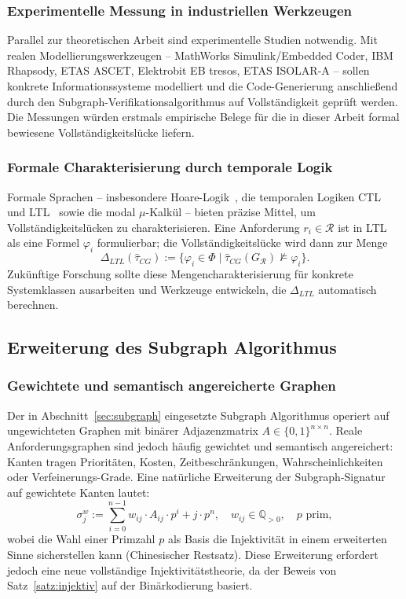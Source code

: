 ﻿\documentclass[a4paper,12pt]{article}
\theoremstyle{definition}
\begin{document}
\subsubsection{Experimentelle Messung in industriellen Werkzeugen}

Parallel zur theoretischen Arbeit sind experimentelle Studien notwendig.
Mit realen Modellierungswerkzeugen -- MathWorks Simulink/Embedded Coder, IBM Rhapsody,
ETAS ASCET, Elektrobit EB tresos, ETAS ISOLAR-A -- sollen konkrete Informationssysteme
modelliert und die Code-Generierung anschließend durch den Subgraph-Verifikationsalgorithmus
auf Vollständigkeit geprüft werden. Die Messungen würden erstmals empirische Belege für
die in dieser Arbeit formal bewiesene Vollständigkeitslücke liefern.

\subsubsection{Formale Charakterisierung durch temporale Logik}

Formale Sprachen -- insbesondere Hoare-Logik~\cite{hoare1969}, die temporalen Logiken
CTL~\cite{clarke1982} und LTL~\cite{pnueli1977} sowie die modal $\mu$-Kalkül --
bieten präzise Mittel, um Vollständigkeitslücken zu charakterisieren. Eine Anforderung
$r_i \in \mathcal{R}$ ist in LTL als eine Formel $\varphi_i$ formulierbar; die
Vollständigkeitslücke wird dann zur Menge
\[
  \Delta_{LTL}(\hat{\tau}_{CG}) :=
  \{\varphi_i \in \Phi \mid \hat{\tau}_{CG}(G_\mathcal{R}) \not\models \varphi_i\}.
\]
Zukünftige Forschung sollte diese Mengencharakterisierung für konkrete Systemklassen
ausarbeiten und Werkzeuge entwickeln, die $\Delta_{LTL}$ automatisch berechnen.

\subsection{Erweiterung des Subgraph Algorithmus}

\subsubsection{Gewichtete und semantisch angereicherte Graphen}

Der in Abschnitt~\ref{sec:subgraph} eingesetzte Subgraph Algorithmus operiert auf
ungewichteten Graphen mit binärer Adjazenzmatrix $A \in \{0,1\}^{n \times n}$.
Reale Anforderungsgraphen sind jedoch häufig gewichtet und semantisch angereichert:
Kanten tragen Prioritäten, Kosten, Zeitbeschränkungen, Wahrscheinlichkeiten
oder Verfeinerungs-Grade. Eine natürliche Erweiterung der Subgraph-Signatur auf
gewichtete Kanten lautet:
\[
  \sigma_j^w := \sum_{i=0}^{n-1} w_{ij} \cdot A_{ij} \cdot p^i + j \cdot p^n,
  \quad w_{ij} \in \mathbb{Q}_{>0}, \quad p \text{ prim},
\]
wobei die Wahl einer Primzahl $p$ als Basis die Injektivität in einem erweiterten
Sinne sicherstellen kann (Chinesischer Restsatz). Diese Erweiterung erfordert jedoch
eine neue vollständige Injektivitätstheorie, da der Beweis von Satz~\ref{satz:injektiv}
auf der Binärkodierung basiert.
\end{document}
